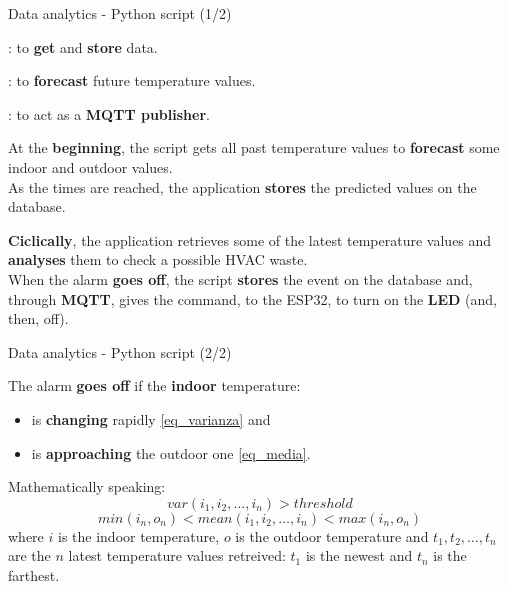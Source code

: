 \documentclass{beamer}
\begin{document}
\begin{frame}{Data analytics -  Python script (1/2)}

	\begin{description}[\texttt{influxdb-client}]		%
		\item[\texttt{influxdb-client}]: to \textbf{get} and \textbf{store} data.
		\item[\texttt{prophet}]: to \textbf{forecast} future temperature values.
		\item[\texttt{paho-mqtt}]: to act as a \textbf{MQTT publisher}.
	\end{description}

	\vfill

	At the \textbf{beginning}, the script gets all past temperature values to \textbf{forecast} some indoor and outdoor values.\\As the times are reached, the application \textbf{stores} the predicted values on the database.
	
	\vfill
	
	\textbf{Ciclically}, the application retrieves some of the latest temperature values and \textbf{analyses} them to check a possible HVAC waste.\\
	When the alarm \textbf{goes off}, the script \textbf{stores} the event on the database and, through \textbf{MQTT}, gives the command, to the ESP32, to turn on the \textbf{LED} (and, then, off).

\end{frame}


\begin{frame}{Data analytics -  Python script (2/2)}

	The alarm \textbf{goes off} if the \textbf{indoor} temperature:
	\begin{itemize}
		\item is \textbf{changing} rapidly \eqref{eq_varianza} and
		\item is \textbf{approaching} the outdoor one \eqref{eq_media}.
	\end{itemize}
	
	\vfill
	
	Mathematically speaking:
	\begin{equation}
	var(i_1, i_2, \dots, i_n) > threshold \label{eq_varianza}
	\end{equation}
	\begin{equation}
	min(i_n, o_n) < mean(i_1, i_2, \dots, i_n) < max(i_n, o_n) \label{eq_media}
	\end{equation}
	where $i$ is the indoor temperature, $o$ is the outdoor temperature and $t_1, t_2, \dots, t_n$ are the $n$ latest temperature values retreived: $t_1$ is the newest and $t_n$ is the farthest.

\end{frame}
\end{document}
